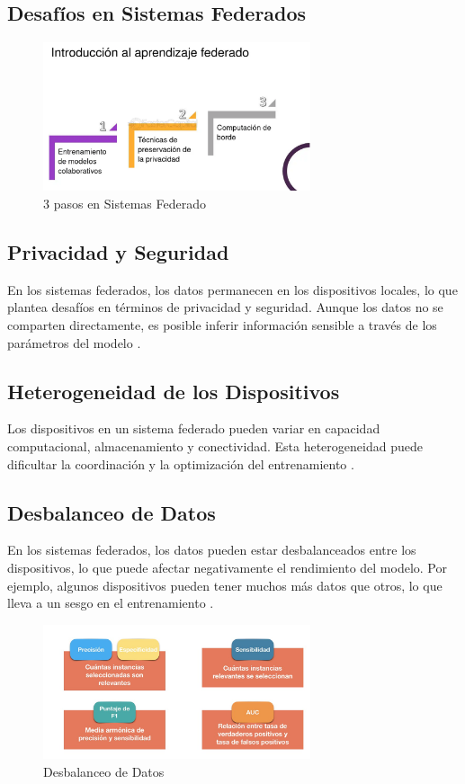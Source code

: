 \subsection{Desafíos en Sistemas Federados}
\begin{figure}[h!]
	\centering
	\includegraphics[width=0.7\textwidth]{federado.png} %
	\caption{3 pasos en Sistemas Federado}
	\label{fig:graficofuncion}
\end{figure}
\subsection{Privacidad y Seguridad}
En los sistemas federados, los datos permanecen en los dispositivos locales, lo que plantea desafíos en términos de privacidad y seguridad. Aunque los datos no se comparten directamente, es posible inferir información sensible a través de los parámetros del modelo \cite{bonawitz2019practical}.

\subsection{Heterogeneidad de los Dispositivos}
Los dispositivos en un sistema federado pueden variar en capacidad computacional, almacenamiento y conectividad. Esta heterogeneidad puede dificultar la coordinación y la optimización del entrenamiento \cite{konevcny2016federated}.

\subsection{Desbalanceo de Datos}
En los sistemas federados, los datos pueden estar desbalanceados entre los dispositivos, lo que puede afectar negativamente el rendimiento del modelo. Por ejemplo, algunos dispositivos pueden tener muchos más datos que otros, lo que lleva a un sesgo en el entrenamiento \cite{zhao2018federated}.
\begin{figure}[h!]
	\centering
	\includegraphics[width=0.7\textwidth]{48051875383_404cdbc5a9_b.jpg} %
	\caption{Desbalanceo de Datos}
	\label{fig:graficofuncion}
\end{figure}
